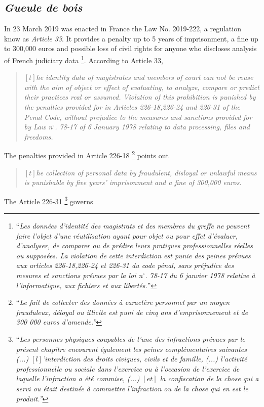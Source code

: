 \documentclass[a4paper]{exam}
\theoremstyle{plain}
\begin{document}
\subsection{\textit{Gueule de bois}}

In 23 March 2019 was enacted in France the Law No. 2019-222, a regulation know as \textit{Article 33}. It provides a penalty up to 5 years of imprisonment, a fine up to 300,000 euros and possible loss of civil rights for anyone who discloses analysis of French judiciary data \cite{france2019article}\footnote{ ``\textit{Les données d’identité des magistrats et des membres du greffe ne peuvent faire l’objet d’une réutilisation ayant pour objet ou pour effet d’évaluer, d’analyser, de comparer ou de prédire leurs pratiques professionnelles réelles ou supposées. La violation de cette interdiction est punie des peines prévues aux articles 226-18,226-24 et 226-31 du code pénal, sans préjudice des mesures et sanctions prévues par la loi n$^{\circ}$. 78-17 du 6 janvier 1978 relative à l'informatique, aux fichiers et aux libertés.}''}. According to Article 33,

\begin{quote}
\textit{$\left[t\right]$he identity data of magistrates and members of court can not be reuse with the aim of object or effect of evaluating, to analyze, compare or predict their practices real or assumed. Violation of this prohibition is punished by the penalties provided for in Articles 226-18,226-24 and 226-31 of the Penal Code, without prejudice to the measures and sanctions provided for by Law n$^{\circ}$. 78-17 of 6 January 1978 relating to data processing, files and freedoms.}
\end{quote}

The penalties provided in Article 226-18 \cite{france2004article}\footnote{ ``\textit{Le fait de collecter des données à caractère personnel par un moyen frauduleux, déloyal ou illicite est puni de cinq ans d'emprisonnement et de 300 000 euros d'amende.''}} points out
\begin{quote}
\textit{$\left[t\right]$he collection of personal data by fraudulent, disloyal or unlawful means is punishable by five years' imprisonment and a fine of 300,000 euros.}
\end{quote}

The Article 226-31 \cite{france1994article}\footnote{ ``\textit{Les personnes physiques coupables de l'une des infractions prévues par le présent chapitre encourent également les peines complémentaires suivantes (...) $\left[l\right]$'interdiction des droits civiques, civils et de famille, (...) l'activité professionnelle ou sociale dans l'exercice ou à l'occasion de l'exercice de laquelle l'infraction a été commise, (...) $\left[et\right]$ la confiscation de la chose qui a servi ou était destinée à commettre l'infraction ou de la chose qui en est le produit.''}} governs
\end{document}
